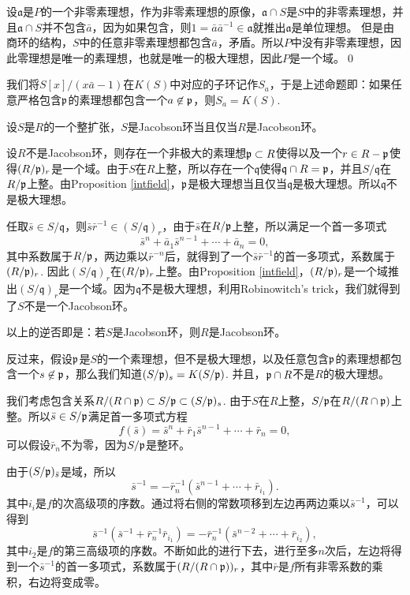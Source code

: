 设$\mathfrak{a}$是$P$的一个非零素理想，作为非零素理想的原像，$\mathfrak{a}\cap S$是$S$中的非零素理想，并且$\mathfrak{a}\cap S$并不包含$\bar{a}$，因为如果包含，则$1=\bar{a}\bar{a}^{-1}\in \mathfrak{a}$就推出$\mathfrak{a}$是单位理想。 但是由商环的结构，$S$中的任意非零素理想都包含$\bar{a}$，矛盾。所以$P$中没有非零素理想，因此零理想是唯一的素理想，也就是唯一的极大理想，因此$P$是一个域。\qed

我们将$S[x]/(x\bar{a}-1)$在$K(S)$中对应的子环记作$S_a$，于是上述命题即：如果任意严格包含$\mathfrak{p}$的素理想都包含一个$a\not\in \mathfrak{p}$，则$S_a=K(S)$. 

\pro 设$S$是$R$的一个整扩张，$S$是Jacobson环当且仅当$R$是Jacobson环。

\proof
	设$R$不是Jacobson环，则存在一个非极大的素理想$\mathfrak{p}\subset R$使得以及一个$r\in R-\mathfrak{p}$使得$(R/\mathfrak{p})_r$是一个域。由于$S$在$R$上整，所以存在一个$\mathfrak{q}$使得$\mathfrak{q}\cap R=\mathfrak{p}$，并且$S/\mathfrak{q}$在$R/\mathfrak{p}$上整。由Proposition \eqref{intfield}，$\mathfrak{p}$是极大理想当且仅当$\mathfrak{q}$是极大理想。所以$\mathfrak{q}$不是极大理想。

	任取$\bar{s}\in S/\mathfrak{q}$，则$\bar{s}\bar{r}^{-1}\in (S/\mathfrak{q})_r$，由于$\bar{s}$在$R/\mathfrak{p}$上整，所以满足一个首一多项式
	\[
	\bar{s}^n+\bar{a}_1\bar{s}^{n-1}+\cdots+ \bar{a}_n=0,
	\]
	其中系数属于$R/\mathfrak{p}$，两边乘以$\bar{r}^{-n}$后，就得到了一个$\bar{s}\bar{r}^{-1}$的首一多项式，系数属于$(R/\mathfrak{p})_r$. 因此$(S/\mathfrak{q})_r$在$(R/\mathfrak{p})_r$上整。由Proposition \eqref{intfield}，$(R/\mathfrak{p})_r$是一个域推出$(S/\mathfrak{q})_r$是一个域。因为$\mathfrak{q}$不是极大理想，利用Robinowitch's trick，我们就得到了$S$不是一个Jacobson环。

	以上的逆否即是：若$S$是Jacobson环，则$R$是Jacobson环。

	反过来，假设$\mathfrak{p}$是$S$的一个素理想，但不是极大理想，以及任意包含$\mathfrak{p}$的素理想都包含一个$s\not\in \mathfrak{p}$，那么我们知道$(S/\mathfrak{p})_{s}=K(S/\mathfrak{p})$. 并且，$\mathfrak{p} \cap R$不是$R$的极大理想。

	我们考虑包含关系$R/(R\cap \mathfrak{p})\subset S/\mathfrak{p}\subset (S/\mathfrak{p})_{s}$. 由于$S$在$R$上整，$S/\mathfrak{p}$在$R/(R\cap \mathfrak{p})$上整。所以$\bar{s}\in S/\mathfrak{p}$满足首一多项式方程
	\[
	f(\bar{s})=\bar{s}^n+\bar{r}_1\bar{s}^{n-1}+\cdots+\bar{r}_n=0,
	\]
	可以假设$\bar{r}_n$不为零，因为$S/\mathfrak{p}$是整环。

	由于$(S/\mathfrak{p})_{\bar{s}}$是域，所以
	\[
	\bar{s}^{-1}=-\bar{r}_n^{-1}(\bar{s}^{n-1}+\cdots+\bar{r}_{i_1}).
	\]
	其中$i_i$是$f$的次高级项的序数。通过将右侧的常数项移到左边再两边乘以$\bar{s}^{-1}$，可以得到
	\[
	\bar{s}^{-1}(\bar{s}^{-1}+\bar{r}_n^{-1}\bar{r}_{i_1})=-\bar{r}_n^{-1}(\bar{s}^{n-2}+\cdots+\bar{r}_{i_2}),
	\]
	其中$i_2$是$f$的第三高级项的序数。不断如此的进行下去，进行至多$n$次后，左边将得到一个$\bar{s}^{-1}$的首一多项式，系数属于$(R/(R\cap \mathfrak{p}))_{r}$，其中$\bar{r}$是$f$所有非零系数的乘积，右边将变成零。

